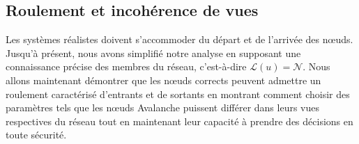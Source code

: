 \documentclass[letterpaper,twocolumn,10pt]{article}
\theoremstyle{definition}
\begin{document}
\begin{appendices}
\subsection{Roulement et incohérence de vues}\label{sec:full-analysis-churn}

Les systèmes réalistes doivent s'accommoder du départ et de l'arrivée des nœuds.
Jusqu'à présent, nous avons simplifié notre analyse en supposant une connaissance précise des membres du réseau, c'est-à-dire $\mathcal{L}(u) = \mathcal{N}$.
Nous allons maintenant démontrer que les nœuds corrects peuvent admettre un roulement caractérisé d'entrants et de sortants en montrant comment choisir des paramètres tels que les nœuds Avalanche puissent différer dans leurs vues respectives du réseau tout en maintenant leur capacité à prendre des décisions en toute sécurité.

{\color{black} 

}
\end{appendices}
\end{document}
